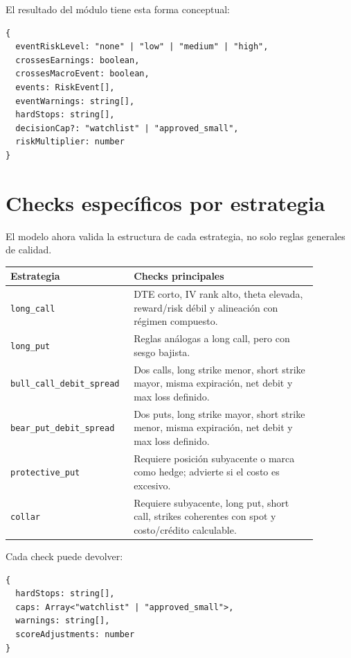 \documentclass[11pt,letterpaper]{article}
\begin{document}
El resultado del m\'odulo tiene esta forma conceptual:

\begin{lstlisting}
{
  eventRiskLevel: "none" | "low" | "medium" | "high",
  crossesEarnings: boolean,
  crossesMacroEvent: boolean,
  events: RiskEvent[],
  eventWarnings: string[],
  hardStops: string[],
  decisionCap?: "watchlist" | "approved_small",
  riskMultiplier: number
}
\end{lstlisting}

\section{Checks espec\'ificos por estrategia}

El modelo ahora valida la estructura de cada estrategia, no solo reglas
generales de calidad.

\begin{longtable}{p{0.30\linewidth} p{0.58\linewidth}}
\toprule
\textbf{Estrategia} & \textbf{Checks principales} \\
\midrule
\texttt{long\_call} & DTE corto, IV rank alto, theta elevada, reward/risk
d\'ebil y alineaci\'on con r\'egimen compuesto. \\
\texttt{long\_put} & Reglas an\'alogas a long call, pero con sesgo bajista. \\
\texttt{bull\_call\_debit\_spread} & Dos calls, long strike menor, short strike
mayor, misma expiraci\'on, net debit y max loss definido. \\
\texttt{bear\_put\_debit\_spread} & Dos puts, long strike mayor, short strike
menor, misma expiraci\'on, net debit y max loss definido. \\
\texttt{protective\_put} & Requiere posici\'on subyacente o marca como hedge;
advierte si el costo es excesivo. \\
\texttt{collar} & Requiere subyacente, long put, short call, strikes coherentes
con spot y costo/cr\'edito calculable. \\
\bottomrule
\end{longtable}

Cada check puede devolver:

\begin{lstlisting}
{
  hardStops: string[],
  caps: Array<"watchlist" | "approved_small">,
  warnings: string[],
  scoreAdjustments: number
}
\end{lstlisting}
\end{document}

